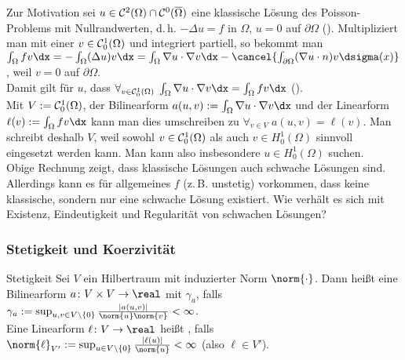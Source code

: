 \begin{Bem}
    Zur Motivation sei $u \in \mathcal{C}^2(\Omega) \cap \mathcal{C}^0(\overline{\Omega})$ eine klassische Lösung
    des Poisson-Problems mit Nullrandwerten, d.\,h.
    $-\Delta u = f$ in $\Omega$, $u = 0$ auf $\partial\Omega$
    ().
    Multipliziert man mit einer  $v \in \mathcal{C}^1_0(\Omega)$ und integriert
    partiell, so bekommt man\\
    $\int_\Omega fv \dx = -\int_\Omega (\Delta u) v \dx
    = \int_\Omega \nabla u \cdot \nabla v \dx -
    \cancel{\int_{\partial\Omega} (\nabla u \cdot n) v \dsigma(x)}$,
    weil $v = 0$ auf $\partial\Omega$.\\
    Damit gilt für $u$, dass
    $\forall_{v \in \C^1_0(\Omega)}\;
    \int_\Omega \nabla u \cdot \nabla v \dx = \int_\Omega fv \dx$
    ().\\
    Mit $V := \mathcal{C}^1_0(\Omega)$,
    der Bilinearform $a(u, v) := \int_\Omega \nabla u \cdot \nabla v \dx$ und der
    Linearform $\ell(v) := \int_\Omega fv \dx$ kann man dies umschreiben zu
    $\forall_{v \in V}\; a(u, v) = \ell(v)$.
    Man schreibt deshalb $V$, weil sowohl $v \in \mathcal{C}^1_0(\Omega)$ als auch
    $v \in H^1_0(\Omega)$ sinnvoll eingesetzt werden kann.
    Man kann also insbesondere  $u \in H^1_0(\Omega)$ suchen.\\
    Obige Rechnung zeigt, dass klassische Lösungen auch schwache Lösungen sind.
    Allerdings kann es für allgemeines $f$ (z.\,B. unstetig) vorkommen, dass keine klassische,
    sondern nur eine schwache Lösung existiert.
    Wie verhält es sich mit Existenz, Eindeutigkeit und Regularität von schwachen Lösungen?
\end{Bem}


\subsubsection{%
    Stetigkeit und Koerzivität%
}

\begin{Def}{Stetigkeit}
    Sei $V$ ein Hilbertraum mit induzierter Norm $\norm{\cdot}$.
    Dann heißt eine Bilinearform $a\colon V \times V \to \real$  mit
     $\gamma_a$, falls
    $\gamma_a := \sup_{u, v \in V \setminus \{0\}} \frac{|a(u, v)|}{\norm{u} \norm{v}} < \infty$.\\
    Eine Linearform $\ell\colon V \to \real$ heißt , falls
    $\norm{\ell}_{V'} := \sup_{u \in V \setminus \{0\}} \frac{|\ell(u)|}{\norm{u}} < \infty$
    (also $\ell \in V'$).
\end{Def}


